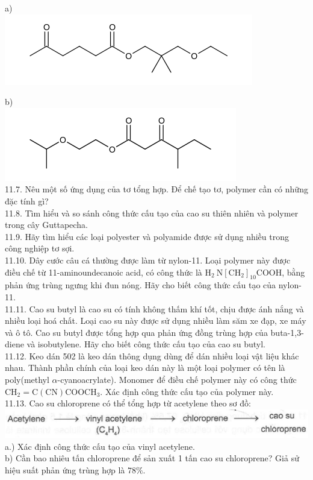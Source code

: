 \documentclass[10pt]{article}
\begin{document}
a)\\
\includegraphics{smile-3caff0bbc889a1d0306f0ab0bad58ee1fbeebd19}

b)\\
\includegraphics{smile-cc6c953c724d0adc358d316cea83deb6de48c376}\\
11.7. Nêu một số ứng dụng của tơ tổng hợp. Để chế tạo tơ, polymer cần có những đặc tính gì?\\
11.8. Tìm hiểu và so sánh công thức cấu tạo của cao su thiên nhiên và polymer trong cây Guttapecha.\\
11.9. Hãy tìm hiểu các loại polyester và polyamide được sử dụng nhiều trong công nghiệp tơ sợi.\\
11.10. Dây cước câu cá thường được làm từ nylon-11. Loại polymer này được điều chế từ 11-aminoundecanoic acid, có công thức là $\mathrm{H}_{2} \mathrm{~N}\left[\mathrm{CH}_{2}\right]_{10} \mathrm{COOH}$, bằng phản ứng trùng ngưng khi đun nóng. Hãy cho biết công thức cấu tạo của nylon-11.\\
11.11. Cao su butyl là cao su có tính không thấm khí tốt, chịu được ánh nắng và nhiều loại hoá chất. Loại cao su này được sử dụng nhiều làm săm xe đạp, xe máy và ô tô. Cao su butyl được tổng hợp qua phản ứng đồng trùng hợp của buta-1,3-diene và isobutylene. Hãy cho biết công thức cấu tạo của cao su butyl.\\
11.12. Keo dán 502 là keo dán thông dụng dùng để dán nhiều loại vật liệu khác nhau. Thành phần chính của loại keo dán này là một loại polymer có tên là poly(methyl $\alpha$-cyanoacrylate). Monomer để điều chế polymer này có công thức $\mathrm{CH}_{2}=\mathrm{C}(\mathrm{CN}) \mathrm{COOCH}_{3}$. Xác định công thức cấu tạo của polymer này.\\
11.13. Cao su chloroprene có thể tổng hợp từ acetylene theo sơ đồ:\\
\includegraphics[max width=\textwidth, center]{2025_10_23_de6f5713836e4e91b3c8g-072}\\
a.) Xác định công thức cấu tạo của vinyl acetylene.\\
b) Cần bao nhiêu tấn chloroprene để sản xuất 1 tấn cao su chloroprene? Giả sử hiệu suất phản ứng trùng hợp là $78 \%$.
\end{document}

